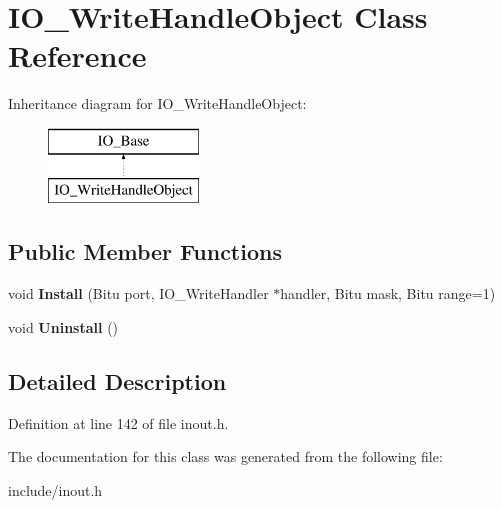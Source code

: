 \hypertarget{classIO__WriteHandleObject}{\section{I\-O\-\_\-\-Write\-Handle\-Object Class Reference}
\label{classIO__WriteHandleObject}
}
Inheritance diagram for I\-O\-\_\-\-Write\-Handle\-Object\-:\begin{figure}[H]
\begin{center}
\leavevmode
\includegraphics[height=2.000000cm]{classIO__WriteHandleObject}
\end{center}
\end{figure}
\subsection*{Public Member Functions}
\begin{DoxyCompactItemize}
\item 
\hypertarget{classIO__WriteHandleObject_a6c095de12fb7ea25bced97029044c6b7}{void {\bfseries Install} (Bitu port, I\-O\-\_\-\-Write\-Handler $\ast$handler, Bitu mask, Bitu range=1)}\label{classIO__WriteHandleObject_a6c095de12fb7ea25bced97029044c6b7}

\item 
\hypertarget{classIO__WriteHandleObject_a52ac1839f892f2e2267a5a97a14c7385}{void {\bfseries Uninstall} ()}\label{classIO__WriteHandleObject_a52ac1839f892f2e2267a5a97a14c7385}

\end{DoxyCompactItemize}


\subsection{Detailed Description}


Definition at line 142 of file inout.\-h.



The documentation for this class was generated from the following file\-:\begin{DoxyCompactItemize}
\item 
include/inout.\-h\end{DoxyCompactItemize}
